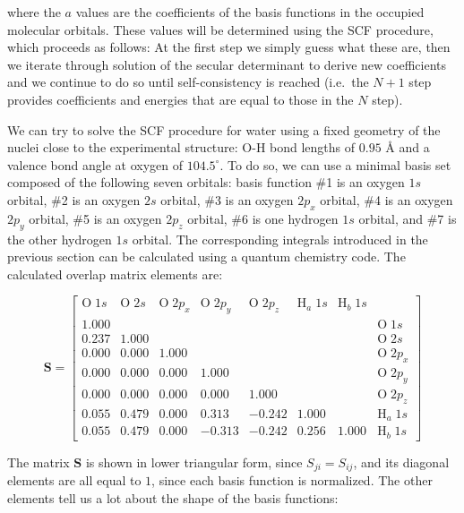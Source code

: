 \documentclass[
  english,
  9pt,
]{extbook}
\theoremstyle{definition}
\theoremstyle{definition}
\theoremstyle{definition}
\theoremstyle{definition}
\theoremstyle{remark}
\begin{document}
where the \(a\) values are the coefficients of the basis functions in the occupied molecular orbitals. These values will be determined using the SCF procedure, which proceeds as follows: At the first step we simply guess what these are, then we iterate through solution of the secular determinant to derive new coefficients and we continue to do so until self-consistency is reached (i.e.~the \(N+1\) step provides coefficients and energies that are equal to those in the \(N\) step).

We can try to solve the SCF procedure for water using a fixed geometry of the nuclei close to the experimental structure: O-H bond lengths of \(0.95\,\,\text{Å}\) and a valence bond angle at oxygen of \(104.5^\circ\). To do so, we can use a minimal basis set composed of the following seven orbitals: basis function \#1 is an oxygen \(1s\) orbital, \#2 is an oxygen \(2s\) orbital, \#3 is an oxygen \(2p_x\) orbital, \#4 is an oxygen \(2p_y\) orbital, \#5 is an oxygen \(2p_z\) orbital, \#6 is one hydrogen \(1s\) orbital, and \#7 is the other hydrogen \(1s\) orbital. The corresponding integrals introduced in the previous section can be calculated using a quantum chemistry code. The calculated overlap matrix elements are:

\begin{equation}
\mathbf{S}=
\begin{bmatrix}
\mathrm{O}\;1s & \mathrm{O}\;2s & \mathrm{O}\;2p_x & \mathrm{O}\;2p_y & \mathrm{O}\;2p_z & \mathrm{H}_a\;1s & \mathrm{H}_b\;1s & \\
1.000 & & & & & &  &\mathrm{O}\;1s \\
0.237 & 1.000 & & & & &  &\mathrm{O}\;2s \\
0.000 & 0.000 & 1.000 & & & & &\mathrm{O}\;2p_x \\
0.000 & 0.000 & 0.000 & 1.000 & & & &\mathrm{O}\;2p_y \\
0.000 & 0.000 & 0.000 & 0.000 & 1.000 & & &\mathrm{O}\;2p_z \\
0.055 & 0.479 & 0.000 & 0.313 & -0.242 & 1.000 &  &\mathrm{H}_a\;1s \\
0.055 & 0.479 & 0.000 & -0.313 & -0.242 & 0.256 & 1.000&\mathrm{H}_b\;1s 
\end{bmatrix}
\label{eq:smatrix}
\end{equation}

The matrix \(\mathbf{S}\) is shown in lower triangular form, since \(S_{ji}=S_{ij}\), and its diagonal elements are all equal to \(1\), since each basis function is normalized. The other elements tell us a lot about the shape of the basis functions:
\end{document}
